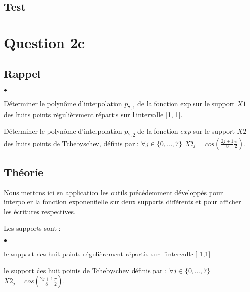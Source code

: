 \documentclass[a4paper,10pt]{report}
\begin{document}
\begin{center}
	
\end{center}

\subsection*{Test}

\section*{Question 2c}

\subsection*{Rappel}

\begin{list}{}{}
\item \begin{list}{$\bullet$}{}
\item Déterminer le polynôme d’interpolation $p_{7,1}$ de la fonction exp sur
le support $X1$ des huits points régulièrement répartis sur l’intervalle [1, 1].
\item Déterminer le polynôme d’interpolation $p_{7,2}$ de la fonction $exp$ sur le
support $X2$ des huits points de Tchebyschev, définis par : $\forall j \in \lbrace 0,...,7 \rbrace$  $X2_{j} = cos(\frac{2j+1}{8} \frac{\pi}{2}).$
\end{list}
\end{list}

\subsection*{Théorie}

Nous mettons ici en application les outils précédemment développés pour interpoler la fonction exponentielle sur deux supports différents et pour afficher les écritures respectives.

Les supports sont :
\begin{list}{}{}
\item \begin{list}{$\bullet$}{}
\item le support des huit points régulièrement répartis sur l’intervalle [-1,1].
\item le support des huit points de Tchebyschev définis par : $\forall j \in \lbrace 0,...,7 \rbrace$  $X2_{j} = cos(\frac{2j+1}{8} \frac{\pi}{2}).$

\end{list}
\end{list}
\end{document}
